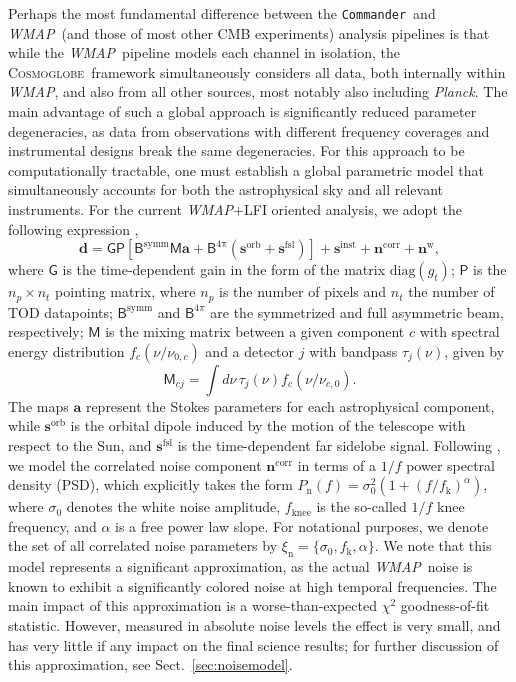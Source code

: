 \documentclass[twocolumn]{../../common/aa}
\def\WMAP{\emph{WMAP}}
\def\Planck{\emph{Planck}}
\def\commander{\texttt{Commander}}
\newcommand{\cosmoglobe}{\textsc{Cosmoglobe}}
\begin{document}
Perhaps the most fundamental difference between the \commander\ and \WMAP\ (and those of most other CMB experiments) analysis pipelines is that while the \WMAP\ pipeline models each channel in isolation, the \cosmoglobe\ framework simultaneously considers all data, both internally within \WMAP, and also from all other sources, most notably also including \Planck. The main advantage of such a global approach is significantly reduced parameter degeneracies, as data from observations with different frequency coverages and instrumental designs break the same degeneracies. For this approach to be computationally tractable, one must establish a global parametric model that simultaneously accounts for both the astrophysical sky and all relevant instruments. For the current \WMAP+LFI oriented analysis, we adopt the following expression \citep{bp01},
\begin{equation}
	\label{eq:model}
	\boldsymbol d =\mathsf G\mathsf P[\mathsf B^\mathrm{symm}\mathsf M\boldsymbol a+\mathsf B^\mathrm{4\pi}(\boldsymbol s^\mathrm{orb}
	+\boldsymbol s^\mathrm{fsl})] + \boldsymbol s^\mathrm{inst}+ \boldsymbol n^\mathrm{corr}+\boldsymbol n^\mathrm w,
\end{equation}
where $\mathsf G$ is the time-dependent gain in the form of the matrix $\mathrm{diag}(g_t)$; $\mathsf P$ is the $n_p\times n_t$ pointing matrix, where $n_p$ is the number of pixels and $n_t$ the number of TOD datapoints;
$\mathsf B^\mathrm{symm}$ and $\mathsf B^{4\pi}$ are the symmetrized and full asymmetric beam, respectively; $\mathsf M$ is the mixing matrix between a given component $c$ with spectral energy distribution $f_c(\nu/\nu_{0,c})$ and a detector $j$ with bandpass $\tau_j(\nu)$, given by
\begin{equation}
	\mathsf M_{cj}=\int d\nu\,\tau_j(\nu)f_c(\nu/\nu_{c,0}).
\end{equation}
The maps $\boldsymbol a$ represent the Stokes parameters for each astrophysical component, while $\boldsymbol s^\mathrm{orb}$ is the orbital dipole induced by the motion of the telescope with respect to the Sun, and $\boldsymbol s^\mathrm{fsl}$ is the time-dependent far sidelobe signal. Following \citet{bp06}, we model the correlated noise component $\boldsymbol n^\mathrm{corr}$ in terms of a $1/f$ power spectral density (PSD), which explicitly takes the form $P_\mathrm{n}(f) = \sigma^2_0 (1 + (f/f_\mathrm{k})^\alpha)$, where $\sigma_0$ denotes the white noise amplitude, $f_\mathrm{knee}$ is the so-called $1/f$ knee frequency, and $\alpha$ is a free power law slope. For notational purposes, we denote the set of all correlated noise parameters by $\xi_{\mathrm{n}} = \{\sigma_0, f_{\mathrm{k}}, \alpha\}$. We note that this model represents a significant approximation, as the actual \WMAP\ noise is known to exhibit a significantly colored noise at high temporal frequencies. The main impact of this approximation is a worse-than-expected $\chi^2$ goodness-of-fit statistic. However, measured in absolute noise levels the effect is very small, and has very little if any impact on the final science results; for further discussion of this approximation, see Sect.~\ref{sec:noisemodel}. 
\end{document}
